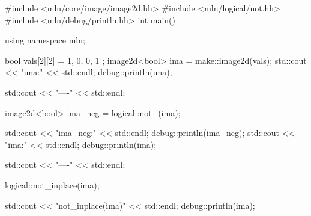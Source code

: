 #include <mln/core/image/image2d.hh>
#include <mln/logical/not.hh>
#include <mln/debug/println.hh>
int main()
{
  using namespace mln;

  bool vals[2][2] = {
    {1, 0},
    {0, 1}
  };
  image2d<bool> ima = make::image2d(vals);
  std::cout << "ima:" << std::endl;
  debug::println(ima);

  std::cout << "----" << std::endl;

  image2d<bool> ima_neg = logical::not_(ima);

  std::cout << "ima_neg:" << std::endl;
  debug::println(ima_neg);
  std::cout << "ima:" << std::endl;
  debug::println(ima);

  std::cout << "----" << std::endl;

  logical::not_inplace(ima);

  std::cout << "not_inplace(ima)" << std::endl;
  debug::println(ima);
}
